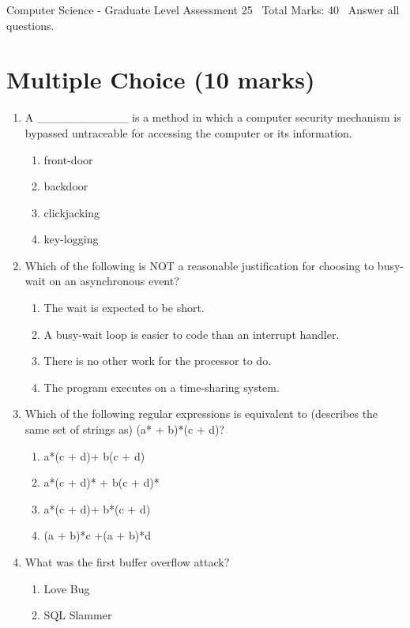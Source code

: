 \documentclass[12pt]{article}
\begin{document}
\begin{center}
Computer Science - Graduate Level Assessment 25 \
Total Marks: 40 \
Answer all questions.
\end{center}

\section*{Multiple Choice (10 marks)}
\begin{enumerate}[label=\arabic*.]
\item A \_\_\_\_\_\_\_\_\_\_\_ is a method in which a computer security mechanism is bypassed untraceable for accessing the computer or its information.
\begin{enumerate}[label=(\alph*)]
    \item front-door
    \item backdoor
    \item clickjacking
    \item key-logging
\end{enumerate}
\item Which of the following is NOT a reasonable justification for choosing to busy-wait on an asynchronous event?
\begin{enumerate}[label=(\alph*)]
    \item The wait is expected to be short.
    \item A busy-wait loop is easier to code than an interrupt handler.
    \item There is no other work for the processor to do.
    \item The program executes on a time-sharing system.
\end{enumerate}
\item Which of the following regular expressions is equivalent to (describes the same set of strings as) (a* + b)*(c + d)?
\begin{enumerate}[label=(\alph*)]
    \item a*(c + d)+ b(c + d)
    \item a*(c + d)* + b(c + d)*
    \item a*(c + d)+ b*(c + d)
    \item (a + b)*c +(a + b)*d
\end{enumerate}
\item What was the first buffer overflow attack?
\begin{enumerate}[label=(\alph*)]
    \item Love Bug
    \item SQL Slammer

\end{enumerate}
\end{enumerate}
\end{document}
